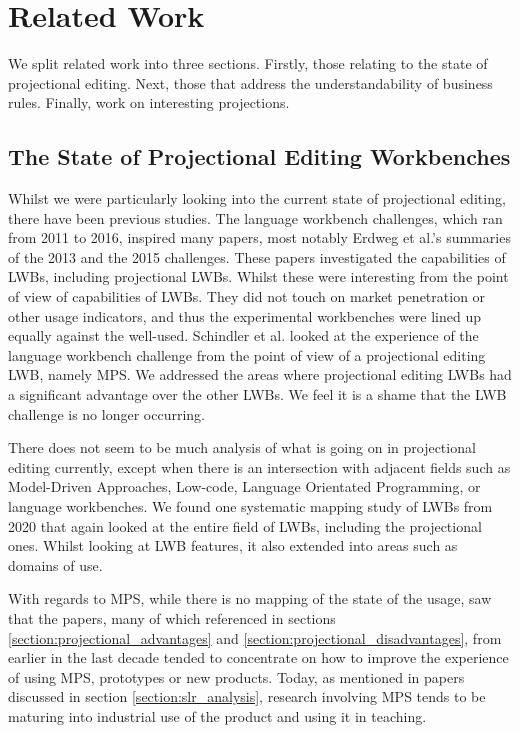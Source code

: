 \chapter{Related Work}
\label{chapter:RelatedWork}

We split related work into three sections. 
Firstly, those relating to the state of projectional editing.
Next, those that address the understandability of business rules.
Finally, work on interesting projections.

\section{The State of Projectional Editing Workbenches}

Whilst we were particularly looking into the current state of projectional editing, there have been previous studies.
The language workbench challenges, which ran from 2011 to 2016, inspired many papers, most notably Erdweg et al.'s summaries of the 2013\cite{erdweg2013state} and the 2015\cite{erdweg2015evaluating} challenges.
These papers investigated the capabilities of LWBs, including projectional LWBs.
Whilst these were interesting from the point of view of capabilities of LWBs. 
They did not touch on market penetration or other usage indicators, and thus the experimental workbenches were lined up equally against the well-used.
Schindler et al.\cite{schindler2016language} looked at the experience of the language workbench challenge from the point of view of a projectional editing LWB, namely MPS.
We addressed the areas where projectional editing LWBs had a significant advantage over the other LWBs. 
We feel it is a shame that the LWB challenge is no longer occurring.

There does not seem to be much analysis of what is going on in projectional editing currently, except when there is an intersection with adjacent fields such as Model-Driven Approaches, Low-code, Language Orientated Programming, or language workbenches.
We found one systematic mapping study of LWBs\cite{iung2020systematic} from 2020 that again looked at the entire field of LWBs, including the projectional ones.
Whilst looking at LWB features, it also extended into areas such as domains of use.

With regards to MPS, while there is no mapping of the state of the usage, saw that the papers, many of which referenced in sections \ref{section:projectional_advantages} and \ref{section:projectional_disadvantages}, from earlier in the last decade tended to concentrate on how to improve the experience of using MPS, prototypes or new products.
Today, as mentioned in papers discussed in section \ref{section:slr_analysis}, research involving MPS tends to be maturing into industrial use of the product and using it in teaching.

